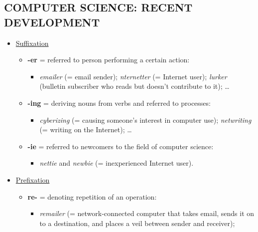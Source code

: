 \subsection{COMPUTER SCIENCE: RECENT DEVELOPMENT}

\begin{itemize}

\item\underline{Suffixation}

\begin{itemize}

\item\textbf{-er} = referred to person performing a certain action:

\begin{itemize}
\item \textit{emailer} (= email sender); \textit{nternetter} (= Internet user); \textit{lurker} (bulletin subscriber who reads but doesn’t contribute to it); …
\end{itemize}

\item \textbf{-ing} = deriving nouns from verbs and referred to processes:

\begin{itemize}
\item \textit{cyberizing} (= causing someone’s interest in computer use); \textit{netwriting} (= writing on the Internet); …
\end{itemize}

\item \textbf{-ie} = referred to newcomers to the field of computer science:

\begin{itemize}
\item \textit{nettie} and \textit{newbie} (= inexperienced Internet user). 
\end{itemize}

\end{itemize}

\item\underline{Prefixation}

\begin{itemize}

\item \textbf{re-} = denoting repetition of an operation:

\begin{itemize}
\item \textit{remailer} (= network-connected computer that takes email, sends it on to a destination, and places a veil between sender and receiver);
\end{itemize}


\end{itemize}
\end{itemize}
